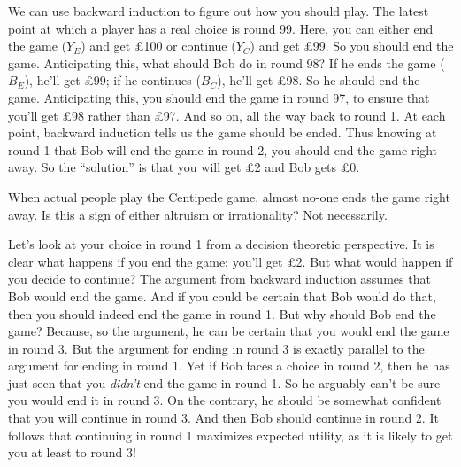 We can use backward induction to figure out how you should play. The
latest point at which a player has a real choice is round 99. Here,
you can either end the game ($Y_E$) and get £100 or continue ($Y_C$)
and get £99. So you should end the game. Anticipating this, what
should Bob do in round 98? If he ends the game ($B_E$), he'll get £99;
if he continues ($B_C$), he'll get £98. So he should end the
game. Anticipating this, you should end the game in round 97, to
ensure that you'll get £98 rather than £97. And so on, all the way
back to round 1. At each point, backward induction tells us the game
should be ended. Thus knowing at round 1 that Bob will end the game in
round 2, you should end the game right away. So the ``solution'' is
that you will get £2 and Bob gets £0.


When actual people play the Centipede game, almost no-one ends the
game right away. Is this a sign of either altruism or irrationality?
Not necessarily.

Let's look at your choice in round 1 from a decision theoretic
perspective. It is clear what happens if you end the game: you'll get
£2. But what would happen if you decide to continue? The argument from
backward induction assumes that Bob would end the game. And if you
could be certain that Bob would do that, then you should indeed end
the game in round 1. But why should Bob end the game? Because, so the
argument, he can be certain that you would end the game in round 3.
But the argument for ending in round 3 is exactly parallel to the
argument for ending in round 1. Yet if Bob faces a choice in round 2,
then he has just seen that you \emph{didn't} end the game in round 1.
So he arguably can't be sure you would end it in round 3. On the
contrary, he should be somewhat confident that you will continue in
round 3. And then Bob should continue in round 2. It follows that
continuing in round 1 maximizes expected utility, as it is likely to
get you at least to round 3!


